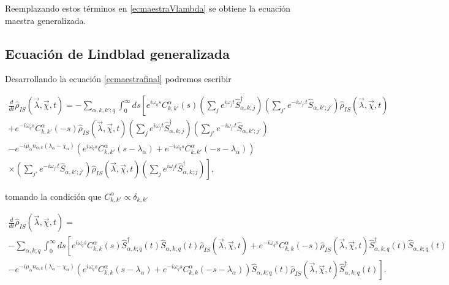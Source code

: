 \begin{appendixs}
Reemplazando estos términos en \ref{ecmaestraVlambda} se obtiene la ecuación maestra generalizada.   

\label{finalequation}

\newpage

\subsection{Ecuación de Lindblad generalizada}
Desarrollando la ecuación \ref{ecmaestrafinal} podremos escribir

\begin{multline*}
    \frac{d}{dt}\hat{\rho}_{IS}(\vec{\lambda},\vec{\chi},t) = - \sum_{\alpha,k,k';q} \int_{0}^{\infty}ds \left[e^{i\omega_{q}s}C^{\alpha}_{k,k'}(s) \left(\sum_{j}e^{i\omega_{j}t}\hat{S}^{\dagger}_{\alpha,k;j} \right)\left(\sum_{j'}e^{-i\omega_{j'}t}\hat{S}_{\alpha,k';j'} \right)\hat{\rho}_{IS}(\vec{\lambda},\vec{\chi},t)  \right. \\
    \left. +  e^{-i\omega_{q}s}C^{\alpha}_{k,k'}(-s) \hat{\rho}_{IS}(\vec{\lambda},\vec{\chi},t) \left(\sum_{j}e^{i\omega_{j}t}\hat{S}^{\dagger}_{\alpha,k;j} \right)\left(\sum_{j'}e^{-i\omega_{j'}t}\hat{S}_{\alpha,k';j'} \right)\right. \\
    \left. - e^{-i\mu_{\alpha}n_{\alpha,k}(\lambda_{\alpha}-\chi_{\alpha})}(e^{i\omega_{q}s}C^{\alpha}_{k,k'}(s-\lambda_{\alpha}) + e^{-i\omega_{q}s}C^{\alpha}_{k,k'}(-s-\lambda_{\alpha}) ) \right.\\
    \left.\times \left(\sum_{j'}e^{-i\omega_{j'}t}\hat{S}_{\alpha,k';j'} \right)\hat{\rho}_{IS}(\vec{\lambda},\vec{\chi},t) \left(\sum_{j}e^{i\omega_{j}t}\hat{S}^{\dagger}_{\alpha,k;j} \right)    \right],   
\end{multline*}

tomando la condición que $C_{k,k'}^{\alpha} \propto \delta_{k,k'}$

\begin{multline*}
    \frac{d}{dt}\hat{\rho}_{IS}(\vec{\lambda},\vec{\chi},t) = \\
     - \sum_{\alpha,k;q} \int_{0}^{\infty}ds \left[e^{i\omega_{q}s}C^{\alpha}_{k,k}(s) \hat{S}^{\dagger}_{\alpha,k;q}(t)\hat{S}_{\alpha,k;q}(t)\hat{\rho}_{IS}(\vec{\lambda},\vec{\chi},t)  +  e^{-i\omega_{q}s}C^{\alpha}_{k,k}(-s) \hat{\rho}_{IS}(\vec{\lambda},\vec{\chi},t) \hat{S}^{\dagger}_{\alpha,k;q}(t) \hat{S}_{\alpha,k;q}(t) \right. \\
    \left. - e^{-i\mu_{\alpha}n_{\alpha,k}(\lambda_{\alpha}-\chi_{\alpha})}(e^{i\omega_{q}s}C^{\alpha}_{k,k}(s-\lambda_{\alpha}) + e^{-i\omega_{q}s}C^{\alpha}_{k,k}(-s-\lambda_{\alpha}) ) \hat{S}_{\alpha,k;q}(t) \hat{\rho}_{IS}(\vec{\lambda},\vec{\chi},t) \hat{S}^{\dagger}_{\alpha,k;q}(t)    \right].  
\end{multline*}


\end{appendixs}
